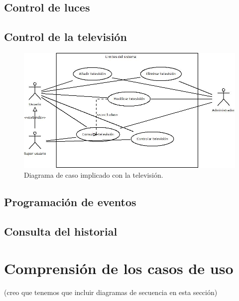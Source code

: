 \subsection{Control de luces}
\subsection{Control de la televisi\'on}
\begin{figure}
	\centering
	\includegraphics[scale=0.5]{4.Disenio/Imagenes/CasoDeUsoTelevision}
	\caption{Diagrama de caso implicado con la televisi\'on.}
\end{figure}
\subsection{Programaci\'on de eventos}
\subsection{Consulta del historial}
\section{Comprensi\'on de los casos de uso}
(creo que tenemos que incluir diagramas de secuencia en esta secci\'on)